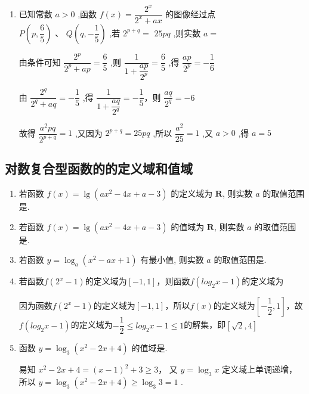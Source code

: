 \begin{enumerate}
\begin{jieda}
\begin{enumerate}
            \item $f(x)$必然是单调函数，因此只需其两个端点满足要求即可保证恒成立，即$f(1) > 1, f(2) > 1$, 解得$a\in(-\infty,-5)\cup(1,+\infty)$. 
            \end{enumerate}
        \end{jieda}
        \item 已知常数 $a > 0$ ,函数 $f\left( x\right)  = \dfrac{{2}^{x}}{{2}^{x} + {ax}}$ 的图像经过点 $P\left( {p,\dfrac{6}{5}}\right) \text{ 、 }Q\left( {q, - \dfrac{1}{5}}\right)$ ,若 ${2}^{p + q} =$  ${25pq}$ ,则实数 $a =$ 
        \begin{jieda}
            由条件可知 $\dfrac{{2}^{p}}{{2}^{p} + {ap}} = \dfrac{6}{5}$ ,则 $\dfrac{1}{1 + \dfrac{ap}{{2}^{p}}} = \dfrac{6}{5}$ ,得 $\dfrac{ap}{{2}^{p}} =  - \dfrac{1}{6}$
            
            由 $\dfrac{{2}^{q}}{{2}^{q} + {aq}} =  - \dfrac{1}{5}$ ,得 $\dfrac{1}{1 + \dfrac{aq}{{2}^{q}}} = - \dfrac{1}{5}$，则 $\dfrac{aq}{{2}^{q}} =  - 6$
            
            故得 $\dfrac{{a}^{2}{pq}}{{2}^{p + q}} = 1$ ,又因为 ${2}^{p + q} = {25pq}$ ,所以 $\dfrac{{a}^{2}}{25} = 1$ ,又 $a > 0$ ,得 $a = 5$
        \end{jieda} 
    \end{enumerate}
    
    \subsection*{对数复合型函数的的定义域和值域}
    \begin{enumerate}
    \item 若函数 $f(x)=\lg \left(a x^2-4 x+a-3\right)$ 的定义域为 $\mathbf{R}$, 则实数 $a$ 的取值范围是.
    \item 若函数 $f(x)=\lg \left(a x^2-4 x+a-3\right)$ 的值域为 $\mathbf{R}$, 则实数 $a$ 的取值范围是.
    \item 若函数 $y=\log _a\left(x^2-a x+1\right)$ 有最小值, 则实数 $a$ 的取值范围是.
    
    
    \item 若函数$f(2^x-1)$的定义域为$[-1, 1]$，则函数$f(log_2x - 1)$的定义域为\blkda{$[\sqrt{2}, 4]$}
    \begin{jieda}
        因为函数$f(2^x-1)$的定义域为$[-1, 1]$，所以$f(x)$的定义域为$[-\dfrac{1}{2}, 1]$，故$f(log_2x - 1)$的定义域为$-\dfrac{1}{2} \leq log_2x - 1 \leq 1$的解集，即$[\sqrt{2}, 4]$
    \end{jieda}
    \item 函数 $y = {\log }_{3}\left( {{x}^{2} - {2x} + 4}\right)$ 的值域是.
    \begin{jieda}
        易知 ${x}^{2} - {2x} + 4 = {\left( x - 1\right) }^{2} + 3 \geq  3$， 又 $y = {\log }_{3}x$ 定义域上单调递增，所以 $y = {\log }_{3}\left( {{x}^{2} - {2x} + 4}\right)  \geq  {\log }_{3}3 = 1$ .
    \end{jieda}
    \end{enumerate}
